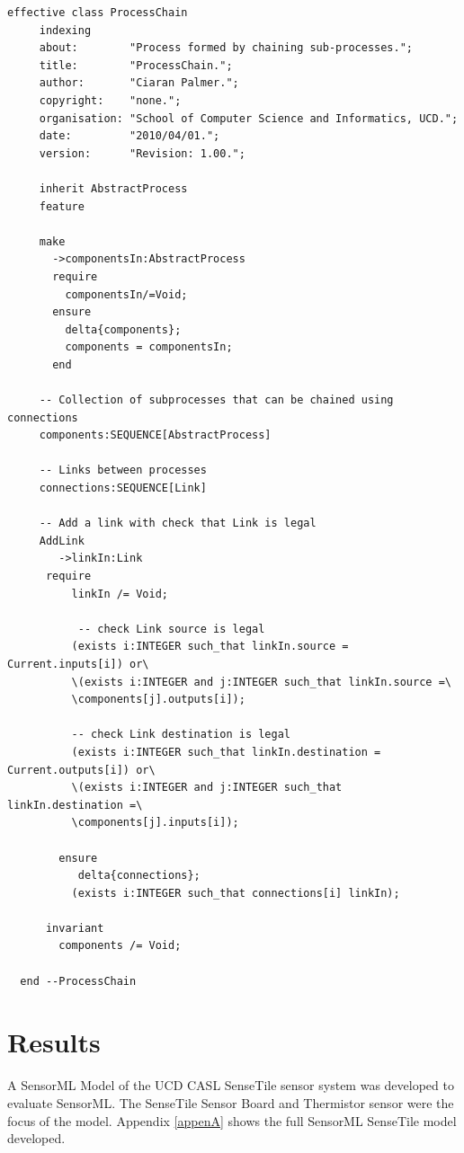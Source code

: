 \documentclass[]{final_report}
\begin{document}
\begin{lstlisting}[basicstyle=\scriptsize,showspaces=false,showstringspaces=false, caption=BON ProcessChain]  
effective class ProcessChain
     indexing
     about:        "Process formed by chaining sub-processes.";
     title:        "ProcessChain.";
     author:       "Ciaran Palmer.";
     copyright:    "none.";
     organisation: "School of Computer Science and Informatics, UCD.";
     date:         "2010/04/01.";
     version:      "Revision: 1.00.";

     inherit AbstractProcess
     feature
     
     make
       ->componentsIn:AbstractProcess
       require
         componentsIn/=Void;         
       ensure
         delta{components};
         components = componentsIn;
       end
     
     -- Collection of subprocesses that can be chained using connections      
     components:SEQUENCE[AbstractProcess]
     
     -- Links between processes
     connections:SEQUENCE[Link]
     
     -- Add a link with check that Link is legal
     AddLink
        ->linkIn:Link
      require
          linkIn /= Void;

           -- check Link source is legal
          (exists i:INTEGER such_that linkIn.source = Current.inputs[i]) or\
          \(exists i:INTEGER and j:INTEGER such_that linkIn.source =\
          \components[j].outputs[i]);

          -- check Link destination is legal
          (exists i:INTEGER such_that linkIn.destination = Current.outputs[i]) or\
          \(exists i:INTEGER and j:INTEGER such_that linkIn.destination =\
          \components[j].inputs[i]);

        ensure
           delta{connections};
          (exists i:INTEGER such_that connections[i] linkIn);
      
      invariant
        components /= Void;
        
  end --ProcessChain
 \end{lstlisting}


\chapter{Results}

A  SensorML Model of the UCD CASL SenseTile sensor system was developed to evaluate SensorML. The SenseTile Sensor Board and Thermistor sensor were the focus of the model. Appendix \ref{appenA} shows the full SensorML SenseTile model developed.
\end{document}
